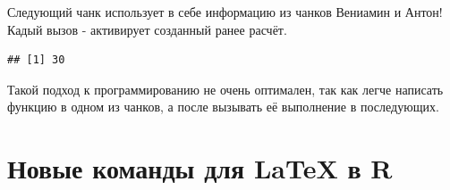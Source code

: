 \documentclass[a4paper]{article}\usepackage[]{graphicx}\usepackage[]{color}
\makeatletter
\newenvironment{kframe}{%
 \def\at@end@of@kframe{}%
 \ifinner\ifhmode%
  \def\at@end@of@kframe{\end{minipage}}%
  \begin{minipage}{\columnwidth}%
 \fi\fi%
 \def\FrameCommand##1{\hskip\@totalleftmargin \hskip-\fboxsep
 \colorbox{shadecolor}{##1}\hskip-\fboxsep
     \hskip-\linewidth \hskip-\@totalleftmargin \hskip\columnwidth}%
 \MakeFramed {\advance\hsize-\width
   \@totalleftmargin\z@ \linewidth\hsize
   \@setminipage}}%
 {\par\unskip\endMakeFramed%
 \at@end@of@kframe}
\newenvironment{knitrout}{}{} %
\makeatother
\begin{document}
Следующий чанк использует в себе информацию из чанков Вениамин и Антон! Кадый вызов - активирует созданный ранее расчёт.

\begin{knitrout}
\color{fgcolor}\begin{kframe}
\begin{verbatim}
## [1] 30
\end{verbatim}
\end{kframe}
\end{knitrout}

Такой подход к программированию не очень оптимален, так как легче написать функцию в одном из чанков, а после вызывать её выполнение в последующих. 


\section{Новые команды для LaTeX в R}
\end{document}

